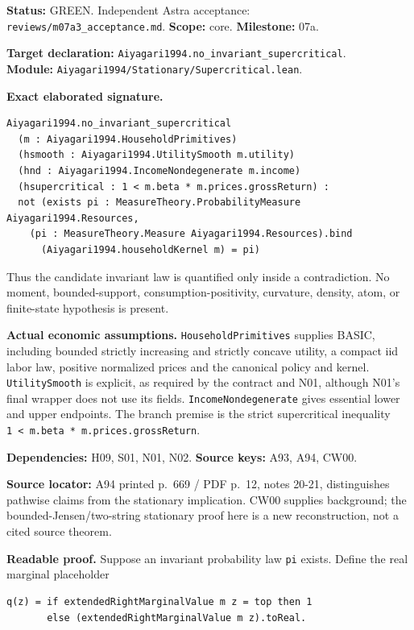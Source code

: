 \documentclass[
  11pt,
]{article}
\let\LedgerOriginalTexttt\texttt
\renewcommand{\texttt}[1]{{\small\LedgerOriginalTexttt{#1}}}
\begin{document}
\textbf{Status:} GREEN. Independent Astra acceptance:
\texttt{reviews/m07a3\_acceptance.md}. \textbf{Scope:} core.
\textbf{Milestone:} 07a.

\textbf{Target declaration:}
\texttt{Aiyagari1994.no\_invariant\_supercritical}.\\
\textbf{Module:} \texttt{Aiyagari1994/Stationary/Supercritical.lean}.

\textbf{Exact elaborated signature.}

\begin{verbatim}
Aiyagari1994.no_invariant_supercritical
  (m : Aiyagari1994.HouseholdPrimitives)
  (hsmooth : Aiyagari1994.UtilitySmooth m.utility)
  (hnd : Aiyagari1994.IncomeNondegenerate m.income)
  (hsupercritical : 1 < m.beta * m.prices.grossReturn) :
  not (exists pi : MeasureTheory.ProbabilityMeasure Aiyagari1994.Resources,
    (pi : MeasureTheory.Measure Aiyagari1994.Resources).bind
      (Aiyagari1994.householdKernel m) = pi)
\end{verbatim}

Thus the candidate invariant law is quantified only inside a
contradiction. No moment, bounded-support, consumption-positivity,
curvature, density, atom, or finite-state hypothesis is present.

\textbf{Actual economic assumptions.} \texttt{HouseholdPrimitives}
supplies BASIC, including bounded strictly increasing and strictly
concave utility, a compact iid labor law, positive normalized prices and
the canonical policy and kernel. \texttt{UtilitySmooth} is explicit, as
required by the contract and N01, although N01's final wrapper does not
use its fields. \texttt{IncomeNondegenerate} gives essential lower and
upper endpoints. The branch premise is the strict supercritical
inequality \texttt{1\ \textless{}\ m.beta\ *\ m.prices.grossReturn}.

\textbf{Dependencies:} H09, S01, N01, N02. \textbf{Source keys:} A93,
A94, CW00.

\textbf{Source locator:} A94 printed p.~669 / PDF p.~12, notes 20-21,
distinguishes pathwise claims from the stationary implication. CW00
supplies background; the bounded-Jensen/two-string stationary proof here
is a new reconstruction, not a cited source theorem.

\textbf{Readable proof.} Suppose an invariant probability law
\texttt{pi} exists. Define the real marginal placeholder

\begin{verbatim}
q(z) = if extendedRightMarginalValue m z = top then 1
       else (extendedRightMarginalValue m z).toReal.
\end{verbatim}
\end{document}

